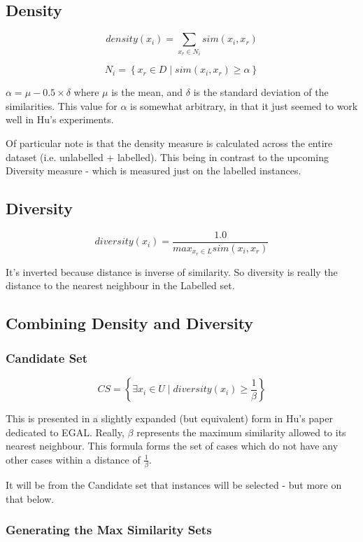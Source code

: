 \documentclass[a4paper,11pt]{report}
\begin{document}
\subsection{Density}
\[
density(x_{i})=\underset{x_{r}\in N_{i}}{\sum}sim(x_{i},x_{r})
\]

\[
N_{i}=\left\{ x_{r}\in D\mid sim(x_{i},x_{r})\geq\alpha\right\} 
\]

$\alpha=\mu-0.5\times\delta$ where $\mu$ is the mean, and $\delta$ is the standard deviation of the similarities. This value for $\alpha$ is somewhat arbitrary, in that it just seemed to work well in Hu's experiments.

Of particular note is that the density measure is calculated across the entire dataset (i.e. unlabelled + labelled). This being in contrast to the upcoming Diversity measure - which is measured just on the labelled instances.

\subsection{Diversity}

\[
diversity(x_{i})=\frac{1.0}{max_{x_{r}\in L}sim(x_{i},x_{r})}
\]

It's inverted because distance is inverse of similarity. So diversity is really the distance to the nearest neighbour in the Labelled set.

\subsection{Combining Density and Diversity}

\subsubsection{Candidate Set}
\[
CS=\left\{ \exists x_{i}\in U\mid diversity(x_{i})\geq\frac{1}{\beta}\right\} 
\]

This is presented in a slightly expanded (but equivalent) form in Hu's paper dedicated to EGAL\cite{Hu2010}. Really, $\beta$ represents the maximum similarity allowed to its nearest neighbour. This formula forms the set of cases which do not have any other cases within a distance of $\frac{1}{\beta}$.

It will be from the Candidate set that instances will be selected - but more on that below.

\subsubsection{Generating the Max Similarity Sets}
\end{document}
